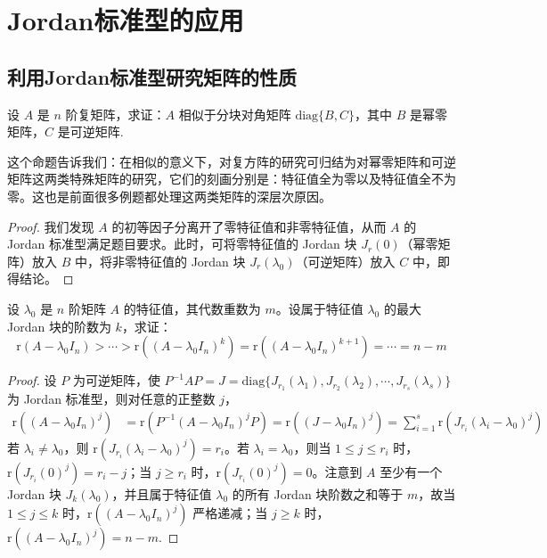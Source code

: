 \documentclass[../../main.tex]{subfiles}%
\begin{document}
\section{Jordan标准型的应用}

\subsection{利用Jordan标准型研究矩阵的性质}

\begin{proposition}\label{proposition:矩阵相似于分块幂零,可逆块}
设 $A$ 是 $n$ 阶复矩阵，求证：$A$ 相似于分块对角矩阵 $\mathrm{diag}\{B,C\}$，其中 $B$ 是幂零矩阵，$C$ 是可逆矩阵.
\end{proposition}
\begin{remark}
这个命题告诉我们：在相似的意义下，对复方阵的研究可归结为对幂零矩阵和可逆矩阵这两类特殊矩阵的研究，它们的刻画分别是：特征值全为零以及特征值全不为零。这也是前面很多例题都处理这两类矩阵的深层次原因。 
\end{remark}
\begin{proof}

我们发现 $A$ 的初等因子分离开了零特征值和非零特征值，从而 $A$ 的 Jordan 标准型满足题目要求。此时，可将零特征值的 Jordan 块 $J_r(0)$（幂零矩阵）放入 $B$ 中，将非零特征值的 Jordan 块 $J_r(\lambda_0)$（可逆矩阵）放入 $C$ 中，即得结论。

\end{proof}

\begin{theorem}
设 $\lambda_0$ 是 $n$ 阶矩阵 $A$ 的特征值，其代数重数为 $m$。设属于特征值 $\lambda_0$ 的最大 Jordan 块的阶数为 $k$，求证：
\[\mathrm{r}(A - \lambda_0I_n) > \cdots > \mathrm{r}((A - \lambda_0I_n)^k) = \mathrm{r}((A - \lambda_0I_n)^{k + 1}) = \cdots = n - m\]
\end{theorem}
\begin{proof}

设 $P$ 为可逆矩阵，使 $P^{-1}AP = J = \mathrm{diag}\{J_{r_1}(\lambda_1),J_{r_2}(\lambda_2),\cdots,J_{r_s}(\lambda_s)\}$ 为 Jordan 标准型，则对任意的正整数 $j$，
\begin{align*}
\mathrm{r}((A - \lambda_0I_n)^j) &= \mathrm{r}(P^{-1}(A - \lambda_0I_n)^jP) = \mathrm{r}((J - \lambda_0I_n)^j) = \sum_{i = 1}^{s}\mathrm{r}(J_{r_i}(\lambda_i - \lambda_0)^j)
\end{align*}
若 $\lambda_i \neq \lambda_0$，则 $\mathrm{r}(J_{r_i}(\lambda_i - \lambda_0)^j) = r_i$。若 $\lambda_i = \lambda_0$，则当 $1 \leqslant  j \leqslant  r_i$ 时，$\mathrm{r}(J_{r_i}(0)^j) = r_i - j$；当 $j \geqslant  r_i$ 时，$\mathrm{r}(J_{r_i}(0)^j) = 0$。注意到 $A$ 至少有一个 Jordan 块 $J_k(\lambda_0)$，并且属于特征值 $\lambda_0$ 的所有 Jordan 块阶数之和等于 $m$，故当 $1 \leqslant  j \leqslant  k$ 时，$\mathrm{r}((A - \lambda_0I_n)^j)$ 严格递减；当 $j \geqslant  k$ 时，$\mathrm{r}((A - \lambda_0I_n)^j) = n - m$.

\end{proof}
\end{document}
